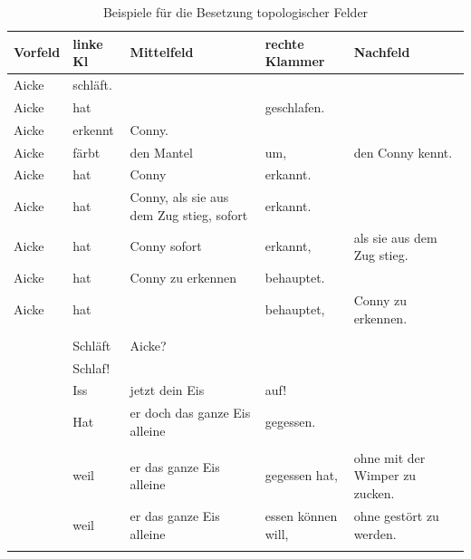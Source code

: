 \begin{table}
\begin{tabular}{lllll}
\lsptoprule
Vorfeld & linke Kl & Mittelfeld                             & rechte Klammer & Nachfeld                   \\\midrule
Aicke    & schläft.                                                                                            \\
Aicke    & hat           &                                        & geschlafen.                                 \\
Aicke    & erkennt       & Conny.                                                                               \\
Aicke    & färbt         & den Mantel                             & um,             & den Conny kennt.           \\
Aicke    & hat           & Conny                                  & erkannt.                                    \\
Aicke    & hat           & Conny, als sie aus dem Zug stieg, sofort & erkannt.                                    \\
Aicke    & hat           & Conny sofort                           & erkannt,        & als sie aus dem Zug stieg. \\
Aicke    & hat           & Conny zu erkennen                      & behauptet.                                  \\
Aicke    & hat           &                                        & behauptet,      & Conny zu erkennen.         \\ \\
        & Schläft       & Aicke?                                                                                \\
        & Schlaf!                                                                                              \\
        & Iss            & jetzt dein Eis                         & auf!                                        \\
        & Hat           & er doch das ganze Eis alleine          & gegessen.                                   \\  \\
        & weil          & er das ganze Eis alleine               & gegessen hat,   & ohne mit der Wimper zu zucken.    \\
        & weil          & er das ganze Eis alleine               & essen können will,   & ohne gestört zu werden.    \\\lspbottomrule
\end{tabular}
\caption{\label{bsp-topo}Beispiele für die Besetzung topologischer Felder}
\end{table}

